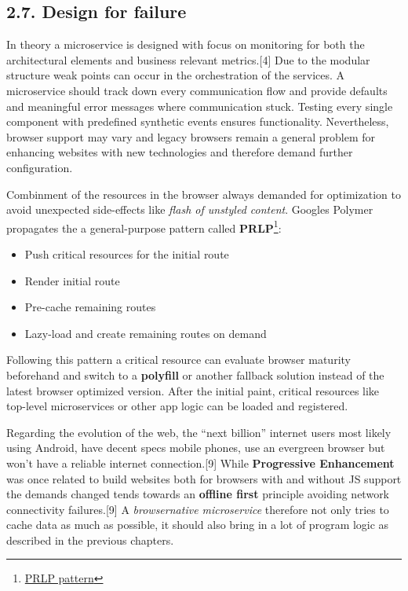 \documentclass[]{article}
\providecommand{\tightlist}{%
  \setlength{\itemsep}{0pt}\setlength{\parskip}{0pt}}
\begin{document}
\subsection{2.7. Design for failure}\label{design-for-failure}

In theory a microservice is designed with focus on monitoring for both
the architectural elements and business relevant metrics.{[}4{]} Due to
the modular structure weak points can occur in the orchestration of the
services. A microservice should track down every communication flow and
provide defaults and meaningful error messages where communication
stuck. Testing every single component with predefined synthetic events
ensures functionality. Nevertheless, browser support may vary and legacy
browsers remain a general problem for enhancing websites with new
technologies and therefore demand further configuration.

Combinment of the resources in the browser always demanded for
optimization to avoid unexpected side-effects like \emph{flash of
unstyled content}. Googles Polymer propagates the a general-purpose
pattern called \textbf{PRLP}\footnote{\href{https://www.polymer-project.org/1.0/toolbox/server}{PRLP
  pattern}}:

\begin{itemize}
\tightlist
\item
  Push critical resources for the initial route
\item
  Render initial route
\item
  Pre-cache remaining routes
\item
  Lazy-load and create remaining routes on demand
\end{itemize}

Following this pattern a critical resource can evaluate browser maturity
beforehand and switch to a \textbf{polyfill} or another fallback
solution instead of the latest browser optimized version. After the
initial paint, critical resources like top-level microservices or other
app logic can be loaded and registered.

Regarding the evolution of the web, the ``next billion'' internet users
most likely using Android, have decent specs mobile phones, use an
evergreen browser but won't have a reliable internet connection.{[}9{]}
While \textbf{Progressive Enhancement} was once related to build
websites both for browsers with and without JS support the demands
changed tends towards an \textbf{offline first} principle avoiding
network connectivity failures.{[}9{]} A \emph{browsernative
microservice} therefore not only tries to cache data as much as
possible, it should also bring in a lot of program logic as described in
the previous chapters.
\end{document}
